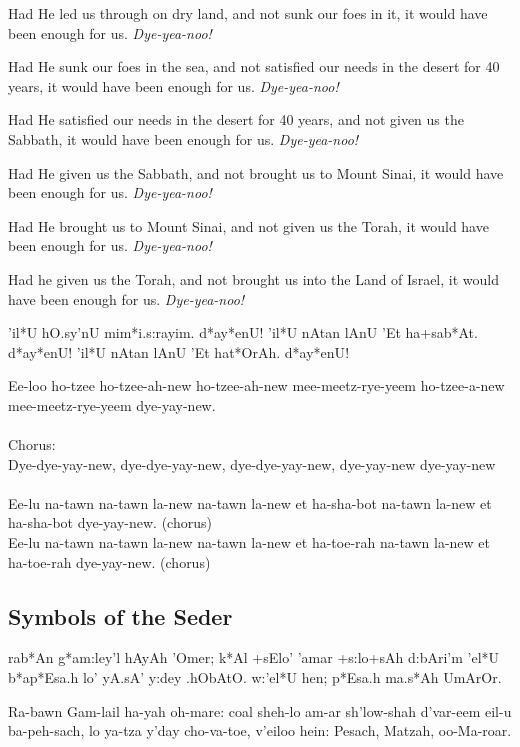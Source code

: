 \documentclass[12pt]{article}
\newenvironment{hebrewPrayer}
    {\begin{cjhebrew}
     \Large
    }
    {
    \end{cjhebrew}
    }
\newenvironment{hebrewTransliteration}{}{\par}
\begin{document}
Had He led us through on dry land, and not sunk our foes in it, it would have been enough for us. \textit{Dye-yea-noo!}

Had He sunk our foes in the sea, and not satisfied our needs in the desert for 40 years, it would have been enough for us. \textit{Dye-yea-noo!}

Had He satisfied our needs in the desert for 40 years, and not given us the Sabbath, it would have been enough for us. \textit{Dye-yea-noo!}

Had He given us the Sabbath, and not brought us to Mount Sinai, it would have been enough for us. \textit{Dye-yea-noo!}

Had He brought us to Mount Sinai, and not given us the Torah, it would have been enough for us. \textit{Dye-yea-noo!}

Had he given us the Torah, and not brought us into the Land of Israel, it would have been enough for us. \textit{Dye-yea-noo!}


\begin{hebrewPrayer}
          'il*U hO.sy'nU mim*i.s:rayim\textrm{.} d*ay*enU\textrm{!} 'il*U nAtan lAnU 'Et ha+sab*At\textrm{.} d*ay*enU\textrm{!} 'il*U nAtan lAnU 'Et hat*OrAh\textrm{.} d*ay*enU\textrm{!}
\end{hebrewPrayer}

\begin{hebrewTransliteration}
    Ee-loo ho-tzee ho-tzee-ah-new ho-tzee-ah-new mee-meetz-rye-yeem ho-tzee-a-new mee-meetz-rye-yeem dye-yay-new. \\ \\
    Chorus: \\
    Dye-dye-yay-new, dye-dye-yay-new, dye-dye-yay-new, dye-yay-new dye-yay-new \\ \\
    Ee-lu na-tawn na-tawn la-new na-tawn la-new et ha-sha-bot na-tawn la-new et ha-sha-bot dye-yay-new. (chorus) \\
    Ee-lu na-tawn na-tawn la-new na-tawn la-new et ha-toe-rah na-tawn la-new et ha-toe-rah dye-yay-new. (chorus)
\end{hebrewTransliteration}

\begin{minipage}[t]{\textwidth}
    \subsection*{Symbols of the Seder}
    \begin{hebrewPrayer}
        rab*An g*am:ley'l hAyAh 'Omer; k*Al +sElo' 'amar +s:lo+sAh d:bAri'm 'el*U b*ap*Esa.h lo' yA.sA' y:dey .hObAtO\textrm{.} w:'el*U hen{}; p*Esa.h ma.s*Ah UmArOr\textrm{.}
    \end{hebrewPrayer}

    \begin{hebrewTransliteration}
        Ra-bawn Gam-lail ha-yah oh-mare: coal sheh-lo am-ar sh'low-shah d'var-eem eil-u ba-peh-sach, lo ya-tza y'day cho-va-toe, v'eiloo hein: Pesach, Matzah, oo-Ma-roar.
    \end{hebrewTransliteration}
\end{minipage}
\end{document}
